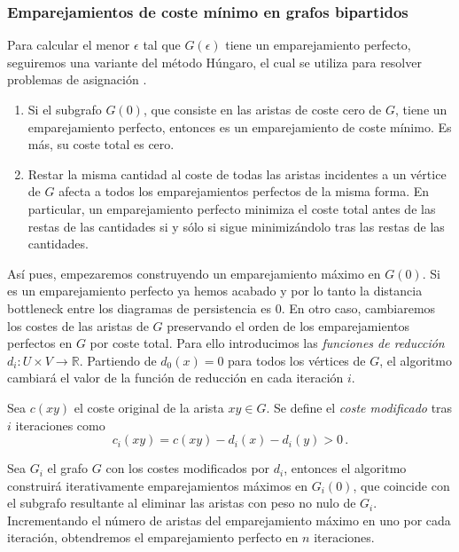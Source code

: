 \subsubsection*{Emparejamientos de coste mínimo en grafos bipartidos}
Para calcular el menor $\epsilon$ tal que $G(\epsilon)$ tiene un emparejamiento perfecto, seguiremos una variante del método Húngaro, el cual se utiliza para resolver problemas de asignación \cite{metodoHungaro}. 

\begin{property}
\leavevmode
\begin{enumerate}
	\item Si el subgrafo $G(0)$, que consiste en las aristas de coste cero de $G$, tiene un emparejamiento perfecto, entonces es un emparejamiento de coste mínimo. Es más, su coste total es cero.
	\item Restar la misma cantidad al coste de todas las aristas incidentes a un vértice de $G$ afecta a todos los emparejamientos perfectos de la misma forma. En particular, un emparejamiento perfecto minimiza el coste total antes de las restas de las cantidades si y sólo si sigue minimizándolo tras las restas de las cantidades.
\end{enumerate}
\end{property}

Así pues, empezaremos construyendo un emparejamiento máximo en $G(0)$. Si es un emparejamiento perfecto ya hemos acabado y por lo tanto la distancia bottleneck entre los diagramas de persistencia es $0$. En otro caso, cambiaremos los costes de las aristas de $G$ preservando el orden de los emparejamientos perfectos en $G$ por coste total. Para ello introducimos las \emph{funciones de reducción} $d_i: U \times V \to \mathbb{R}$. Partiendo de $d_0(x)=0$ para todos los vértices de $G$, el algoritmo cambiará el valor de la función de reducción en cada iteración $i$.

\begin{definition}
Sea $c(xy)$ el coste original de la arista $xy \in G$. Se define el \emph{coste modificado} tras $i$ iteraciones como
\[
c_i(xy) = c(xy) - d_i(x) - d_i(y) > 0\,.
\]
\end{definition}

Sea $G_i$ el grafo $G$ con los costes modificados por $d_i$, entonces el algoritmo construirá iterativamente emparejamientos máximos en $G_i(0)$, que coincide con el subgrafo resultante al eliminar las aristas con peso no nulo de $G_i$. Incrementando el número de aristas del emparejamiento máximo en uno por cada iteración, obtendremos el emparejamiento perfecto en $n$ iteraciones.

